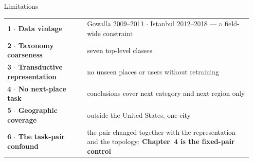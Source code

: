 \documentclass{beamer}
\begin{document}
\begin{frame}{Limitations}
    \vspace{0pt}%
    {\footnotesize
    \setlength{\tabcolsep}{6pt}
    \renewcommand{\arraystretch}{1.5}\begin{tabular}{@{}p{4.4cm} p{8.8cm}@{}}
        \toprule
        \textbf{1 $\cdot$ Data vintage}
            & Gowalla 2009--2011 $\cdot$ Istanbul 2012--2018 --- \alert{a field-wide constraint} \\
        \addlinespace[2.2mm]
        \textbf{2 $\cdot$ Taxonomy coarseness}
            & seven top-level classes \\
        \addlinespace[2.2mm]
        \textbf{3 $\cdot$ Transductive representation}
            & no unseen places or users without retraining \\
        \addlinespace[2.2mm]
        \textbf{4 $\cdot$ No next-place task}
            & conclusions cover next category and next region only \\
        \addlinespace[2.2mm]
        \textbf{5 $\cdot$ Geographic coverage}
            & outside the United States, one city \\
        \addlinespace[2.2mm]
        \textbf{6 $\cdot$ The task-pair confound}
            & the pair changed together with the representation and the topology;
              \textbf{Chapter~4 is the fixed-pair control}
              \\
        \bottomrule
    \end{tabular}\par}
\end{frame}
\end{document}
